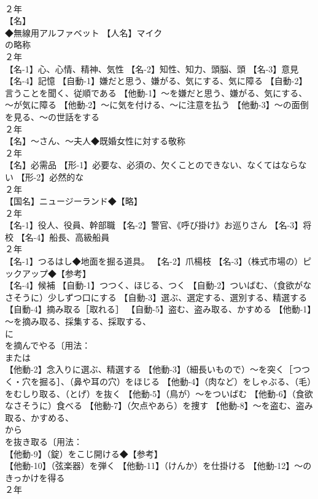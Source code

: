 \documentclass[8pt]{extreport}
\begin{document}
\begin{CJK}{UTF8}{min}
\\	２年	
\\	【名】
\\	◆無線用アルファベット 【人名】マイク
\\	の略称
\\	２年	
\\	【名-1】心、心情、精神、気性 【名-2】知性、知力、頭脳、頭 【名-3】意見 【名-4】記憶 【自動-1】嫌だと思う、嫌がる、気にする、気に障る 【自動-2】言うことを聞く、従順である 【他動-1】～を嫌だと思う、嫌がる、気にする、～が気に障る 【他動-2】～に気を付ける、～に注意を払う 【他動-3】～の面倒を見る、～の世話をする
\\	２年	
\\	【名】～さん、～夫人◆既婚女性に対する敬称
\\	２年	
\\	【名】必需品 【形-1】必要な、必須の、欠くことのできない、なくてはならない 【形-2】必然的な
\\	２年	
\\	【国名】ニュージーランド◆【略】
\\	２年	
\\	【名-1】役人、役員、幹部職 【名-2】警官、《呼び掛け》お巡りさん 【名-3】将校 【名-4】船長、高級船員
\\	２年	
\\	【名-1】つるはし◆地面を掘る道具。 【名-2】爪楊枝 【名-3】（株式市場の）ピックアップ◆【参考】
\\	【名-4】候補 【自動-1】つつく、ほじる、つく 【自動-2】ついばむ、（食欲がなさそうに）少しずつ口にする 【自動-3】選ぶ、選定する、選別する、精選する 【自動-4】摘み取る［取れる］ 【自動-5】盗む、盗み取る、かすめる 【他動-1】～を摘み取る、採集する、採取する、
\\	に 
\\	を摘んでやる〔用法：
\\	または 
\\	【他動-2】念入りに選ぶ、精選する 【他動-3】（細長いもので）～を突く［つつく・穴を掘る］、（鼻や耳の穴）をほじる 【他動-4】（肉など）をしゃぶる、（毛）をむしり取る、（とげ）を抜く 【他動-5】（鳥が）～をついばむ 【他動-6】（食欲なさそうに）食べる 【他動-7】（欠点やあら）を捜す 【他動-8】～を盗む、盗み取る、かすめる、
\\	から 
\\	を抜き取る〔用法：
\\	【他動-9】（錠）をこじ開ける◆【参考】
\\	【他動-10】（弦楽器）を弾く 【他動-11】（けんか）を仕掛ける 【他動-12】～のきっかけを得る
\\	２年	

\end{CJK}
\end{document}
